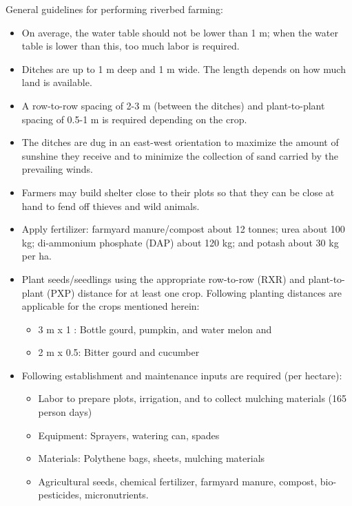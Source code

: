 \documentclass[
]{book}
\providecommand{\tightlist}{%
  \setlength{\itemsep}{0pt}\setlength{\parskip}{0pt}}
\begin{document}
General guidelines for performing riverbed farming:

\begin{itemize}
\item
  On average, the water table should not be lower than 1 m; when the water table is lower than this, too much labor is required.
\item
  Ditches are up to 1 m deep and 1 m wide. The length depends on how much land is available.
\item
  A row-to-row spacing of 2-3 m (between the ditches) and plant-to-plant spacing of 0.5-1 m is required depending on the crop.
\item
  The ditches are dug in an east-west orientation to maximize the amount of sunshine they receive and to minimize the collection of sand carried by the prevailing winds.
\item
  Farmers may build shelter close to their plots so that they can be close at hand to fend off thieves and wild animals.
\item
  Apply fertilizer: farmyard manure/compost about 12 tonnes; urea about 100 kg; di-ammonium phosphate (DAP) about 120 kg; and potash about 30 kg per ha.
\item
  Plant seeds/seedlings using the appropriate row-to-row (RXR) and plant-to-plant (PXP) distance for at least one crop. Following planting distances are applicable for the crops mentioned herein:

  \begin{itemize}
  \tightlist
  \item
    3 m x 1 : Bottle gourd, pumpkin, and water melon and
  \item
    2 m x 0.5: Bitter gourd and cucumber
  \end{itemize}
\item
  Following establishment and maintenance inputs are required (per hectare):

  \begin{itemize}
  \tightlist
  \item
    Labor to prepare plots, irrigation, and to collect mulching materials (165 person days)
  \item
    Equipment: Sprayers, watering can, spades
  \item
    Materials: Polythene bags, sheets, mulching materials
  \item
    Agricultural seeds, chemical fertilizer, farmyard manure, compost, bio-pesticides, micronutrients.
  \end{itemize}
\end{itemize}
\end{document}
